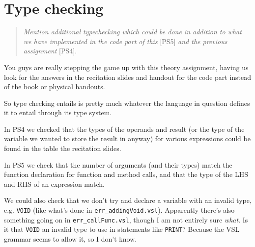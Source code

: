 \section{Type checking}
\begin{quote}
\emph{Mention additional typechecking which could be done in addition to what we have implemented in the code part of this}
	[PS5]
\emph{and the previous assignment}
	[PS4].
\end{quote}

You guys are really stepping the game up with this theory assignment, having us look for the answers in the recitation slides and handout for the code part instead of the book or physical handouts.

So type checking entails is pretty much whatever the language in question defines it to entail through its type system.

In PS4 we checked that the types of the operands and result (or the type of the variable we wanted to store the result in anyway) for various expressions could be found in the table the recitation slides.

In PS5 we check that the number of arguments (and their types) match the function declaration for function and method calls, and that the type of the LHS and RHS of an expression match.

We could also check that we don't try and declare a variable with an invalid type, e.g. \texttt{VOID} (like what's done in \texttt{err\_addingVoid.vsl}).
Apparently there's also something going on in \texttt{err\_callFunc.vsl}, though I am not entirely sure \emph{what}.
Is it that \texttt{VOID} an invalid type to use in statements like \texttt{PRINT}?
Because the VSL grammar seems to allow it, so I don't know.

\newpage
